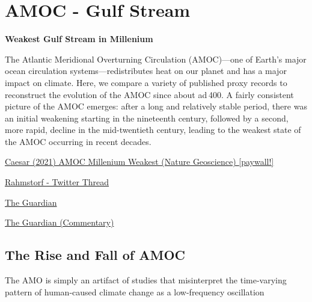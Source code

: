 \documentclass[
]{book}
\begin{document}
\hypertarget{amoc---gulf-stream}{%
\section{AMOC - Gulf Stream}\label{amoc---gulf-stream}}

\textbf{Weakest Gulf Stream in Millenium}

The Atlantic Meridional Overturning Circulation (AMOC)---one of Earth's major ocean circulation systems---redistributes heat on our planet and has a major impact on climate. Here, we compare a variety of published proxy records to reconstruct the evolution of the AMOC since about ad 400. A fairly consistent picture of the AMOC emerges: after a long and relatively stable period, there was an initial weakening starting in the nineteenth century, followed by a second, more rapid, decline in the mid-twentieth century, leading to the weakest state of the AMOC occurring in recent decades.

\href{https://www.nature.com/articles/s41561-021-00699-z}{Caesar (2021) AMOC Millenium Weakest (Nature Geoscience) {[}paywall!{]}}

\href{https://twitter.com/rahmstorf/status/1364976597250568194}{Rahmstorf - Twitter Thread}

\href{https://www.theguardian.com/environment/2021/feb/25/atlantic-ocean-circulation-at-weakest-in-a-millennium-say-scientists}{The Guardian}

\href{https://www.theguardian.com/commentisfree/2021/feb/26/atlantic-currents-climate-oceans-next-century}{The Guardian (Commentary)}

\hypertarget{the-rise-and-fall-of-amoc}{%
\subsection{The Rise and Fall of AMOC}\label{the-rise-and-fall-of-amoc}}

The AMO is simply an artifact of studies that misinterpret
the time-varying pattern of human-caused climate change
as a low-frequency oscillation
\end{document}
